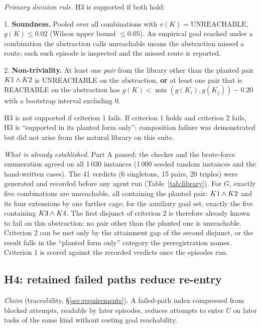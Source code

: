 \emph{Primary decision rule.} H3 is supported if both hold:
\begin{prereg}
1. \textbf{Soundness.} Pooled over all combinations with $v(K) = \mathrm{UNREACHABLE}$, $g(K) \leq 0.02$ (Wilson upper bound $\leq 0.05$). An empirical goal reached under a combination the abstraction calls unreachable means the abstraction missed a route; each such episode is inspected and the missed route is reported.

2. \textbf{Non-triviality.} At least one \emph{pair} from the library other than the planted pair $K1\wedge K2$ is UNREACHABLE on the abstraction, \textbf{or} at least one pair that is REACHABLE on the abstraction has $g(K) < \min(g(K_i), g(K_j)) - 0.20$ with a bootstrap interval excluding 0.
\end{prereg}
H3 is not supported if criterion 1 fails. If criterion 1 holds and criterion 2 fails, H3 is ``supported in its planted form only'': composition failure was demonstrated but did not arise from the natural library on this suite.

\emph{What is already established.} Part A passed: the checker and the brute-force enumeration agreed on all 1\,030 instances (1\,000 seeded random instances and the hand-written cases). The 41 verdicts (6 singletons, 15 pairs, 20 triples) were generated and recorded before any agent run (Table~\ref{tab:library}). For $G$, exactly five combinations are unreachable, all containing the planted pair: $K1\wedge K2$ and its four extensions by one further cage; for the auxiliary goal set, exactly the five containing $K3\wedge K4$. The first disjunct of criterion 2 is therefore already known to fail on this abstraction: no pair other than the planted one is unreachable. Criterion 2 can be met only by the attainment gap of the second disjunct, or the result falls in the ``planted form only'' category the preregistration names. Criterion 1 is scored against the recorded verdicts once the episodes run.


\subsection{H4: retained failed paths reduce re-entry}
\label{sec:h4}

\emph{Claim} (traceability, \S\ref{sec:requirements}). A failed-path index compressed from blocked attempts, readable by later episodes, reduces attempts to enter $U$ on later tasks of the same kind without costing goal reachability.

